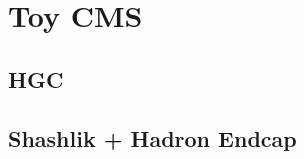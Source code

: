 \section{Toy CMS} \label{section:simulations_scaleup}

\subsection{HGC}

\subsection{Shashlik + Hadron Endcap}